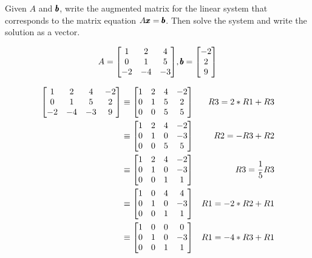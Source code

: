 \documentclass{../mathhomework}
\newenvironment{Mat}{\begin{bmatrix}}{\end{bmatrix}}
\begin{document}
\begin{problem}[1.4\#11]
    Given $A$ and $\pmb{b}$, write the augmented matrix for the linear system that corresponds to the matrix equation $A\pmb{x} = \pmb{b}$. Then solve the system and write the solution as a vector.

    \begin{equation*}
        A = \begin{Mat}
            1 & 2 & 4 \\
            0 & 1 & 5 \\
            -2 & -4 & -3
        \end{Mat}, \Vect{b} = \begin{Mat}
            -2 \\ 2 \\ 9
        \end{Mat}
    \end{equation*}

    \begin{solution}
        \begin{align*}
            \begin{Mat}
            1 & 2 & 4 & -2 \\
            0 & 1 & 5 & 2 \\
            -2 & -4 & -3 & 9
            \end{Mat} & \equiv
            \begin{Mat}
            1 & 2 & 4 & -2 \\
            0 & 1 & 5 & 2 \\
            0 & 0 & 5 & 5  
            \end{Mat} & R3 = 2*R1 + R3 \\ & \equiv
            \begin{Mat}
            1 & 2 & 4 & -2 \\
            0 & 1 & 0 & -3 \\
            0 & 0 & 5 & 5  
            \end{Mat} & R2 = -R3 + R2 \\ & \equiv
            \begin{Mat}
            1 & 2 & 4 & -2 \\
            0 & 1 & 0 & -3 \\
            0 & 0 & 1 & 1  
            \end{Mat} & R3 = \frac{1}{5}R3 \\ & \equiv
            \begin{Mat}
            1 & 0 & 4 & 4 \\
            0 & 1 & 0 & -3 \\
            0 & 0 & 1 & 1  
            \end{Mat} & R1 = -2 * R2 + R1 \\ & \equiv
            \begin{Mat}
            1 & 0 & 0 & 0 \\
            0 & 1 & 0 & -3 \\
            0 & 0 & 1 & 1  
            \end{Mat} & R1 = -4 * R3 + R1 
        \end{align*}


\end{solution}
\end{problem}
\end{document}
